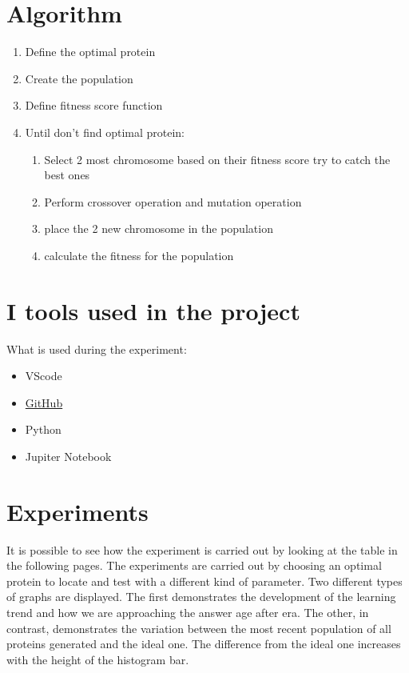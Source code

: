 \documentclass[letterpaper]{article} %
\begin{document}
\section{Algorithm}
\begin{enumerate}
    \item Define the optimal protein
    \item Create the population
    \item Define fitness score function 
    \item Until don't find optimal protein:
    \begin{enumerate}
        \item Select 2 most chromosome based on their fitness score try to catch the best ones
        \item Perform crossover operation and mutation operation
        \item place the 2 new chromosome in the population
        \item calculate the fitness for the population 
    \end{enumerate}
\end{enumerate}


\section{I tools used in the project}
What is used during the experiment:
\begin{itemize}
\item VScode
\item \href{https://github.com/Reevoc/ARTIFICIAL-INTELLIGENCE/blob/main/Genetic%20Algorithm.ipynb}{GitHub}
\item Python 
\item Jupiter Notebook
\end{itemize}

\section{Experiments}
It is possible to see how the experiment is carried out by looking at the table in the following pages. The experiments are carried out by choosing an optimal protein to locate and test with a different kind of parameter. Two different types of graphs are displayed. The first demonstrates the development of the learning trend and how we are approaching the answer age after era. The other, in contrast, demonstrates the variation between the most recent population of all proteins generated and the ideal one. The difference from the ideal one increases with the height of the histogram bar.
\end{document}
